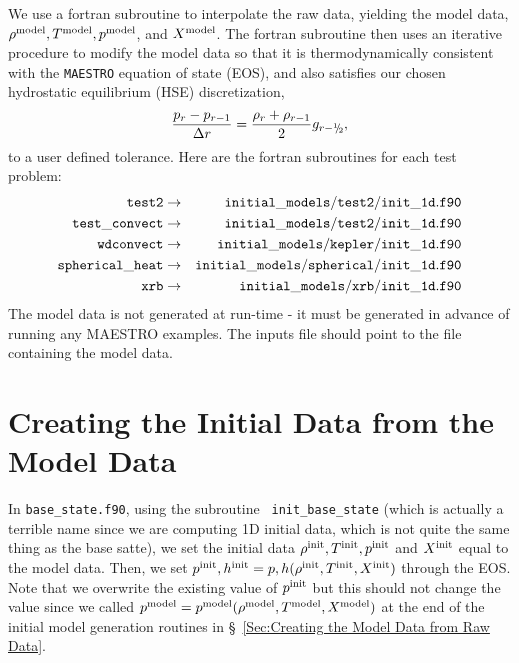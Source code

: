 We use a fortran subroutine
to interpolate the raw data, yielding the model data, $\rho^{\rm model},
T^{\rm model}, p^{\rm model}$, and $X^{\rm model}$.  The fortran subroutine
then uses an iterative procedure to modify the model data so that it
is thermodynamically consistent with the {\tt MAESTRO} equation of
state (EOS), and also satisfies our chosen hydrostatic equilibrium
(HSE) discretization,
\begin{equation}
\frac{p_r - p_{r-1}}{\Delta r} = \frac{\rho_r + \rho_{r-1}}{2}g_{r-\myhalf},\label{HSE Discretization}
\end{equation}
to a user defined tolerance.  Here are the fortran subroutines for each test problem:
\begin{eqnarray}
{\tt test2} & \rightarrow & {\tt initial\_models/test2/init\_1d.f90} \nonumber \\
{\tt test\_convect} & \rightarrow & {\tt initial\_models/test2/init\_1d.f90} \nonumber \\
{\tt wdconvect} & \rightarrow & {\tt initial\_models/kepler/init\_1d.f90} \nonumber \\
{\tt spherical\_heat} & \rightarrow & {\tt initial\_models/spherical/init\_1d.f90} \nonumber \\
{\tt xrb} & \rightarrow & {\tt initial\_models/xrb/init\_1d.f90} \nonumber
\end{eqnarray}
The model data is not generated at run-time - it must be generated in
advance of running any MAESTRO examples.  The inputs file should point
to the file containing the model data.

\section{Creating the Initial Data from the Model Data}
In {\tt base\_state.f90}, using the subroutine {\tt
  init\_base\_state} (which is actually a terrible name since we
are computing 1D initial data, which is not quite the same thing 
as the base satte), we set the initial
data $\rho^{\rm init}, T^{\rm init}, p^{\rm init}$ and $X^{\rm init}$ equal to the
model data.  Then, we set $p^{\rm init},h^{\rm init} =
p,h(\rho^{\rm init},T^{\rm init},X^{\rm init})$ through the EOS.  Note that 
we overwrite the existing value of $p^{\rm init}$ but this should not change
the value since we called 
$p^{\rm model} = p^{\rm model}(\rho^{\rm model},T^{\rm model},X^{\rm model})$ at the end of the
initial model generation routines in 
\S~\ref{Sec:Creating the Model Data from Raw Data}.

